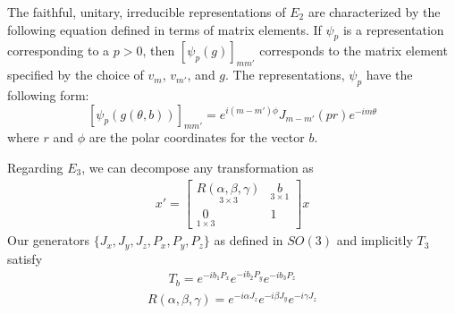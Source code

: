 \documentclass[compress,aspectratio=169,10pt,usenames,dvipsnames]{beamer}
\begin{document}
\begin{frame}
\vfill
\begin{theorem}
	The faithful, unitary, irreducible representations of $E_2$ are characterized by the following equation defined in terms of matrix elements. If $\psi_p$ is a representation corresponding to a $p>0$, then $[\psi_p(g)]_{mm'}$ corresponds to the matrix element specified by the choice of $v_m$, $v_{m'}$, and $g$. The representations, $\psi_p$ have the following form:
$$[\psi_p(g(\theta,b))]_{mm'} = e^{i(m-m')\phi}J_{m-m'}(pr)e^{-im\theta}$$
where $r$ and $\phi$ are the polar coordinates for the vector $b$.
\end{theorem}
\vfill
\end{frame}
%
%
\begin{frame}
\vfill
Regarding $E_3$, we can decompose any transformation as 
\begin{equation}
\begin{aligned}
	x' =
	\begin{bmatrix}
		\underset{3\times 3}{R(\alpha,\beta,\gamma)} & \underset{3\times 1}{b}\\
		\underset{1\times 3}{0} & 1
	\end{bmatrix} x
\end{aligned}
\end{equation}
\vfill
Our generators $\{J_x,J_y,J_z,P_x,P_y,P_z\}$ as defined in $SO(3)$ and implicitly $T_3$ satisfy
\begin{equation}
\begin{aligned}
	T_b = e^{-ib_1P_x}e^{-ib_2P_y}e^{-ib_3P_z}
\end{aligned}
\end{equation}
\begin{equation}
\begin{aligned}
	R(\alpha,\beta,\gamma) = e^{-i\alpha J_z}e^{-i\beta J_y}e^{-i\gamma J_z}
\end{aligned}
\end{equation}	
\vfill
\end{frame}
\end{document}
